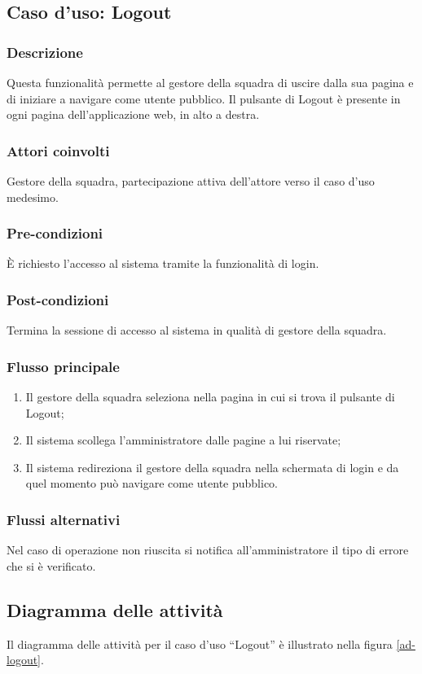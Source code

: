 %
%
\subsection{Caso d'uso: Logout}

\subsubsection*{Descrizione}
Questa funzionalità permette al gestore della squadra di uscire dalla sua pagina e di iniziare a navigare come utente pubblico.
Il pulsante di Logout è presente in ogni pagina dell'applicazione web, in alto a destra.

\subsubsection*{Attori coinvolti}
Gestore della squadra, partecipazione attiva dell'attore verso il caso d'uso medesimo.

\subsubsection*{Pre-condizioni}
È richiesto l'accesso al sistema tramite la funzionalità di login.

\subsubsection*{Post-condizioni}
Termina la sessione di accesso al sistema in qualità di gestore della squadra.

\subsubsection*{Flusso principale}

\begin{enumerate}
	
	\item
	Il gestore della squadra seleziona nella pagina in cui si trova il pulsante di Logout;
	
	\item
	Il sistema scollega l'amministratore dalle pagine a lui riservate;
	
	\item
	Il sistema redireziona il gestore della squadra nella schermata di login e da quel momento può navigare come utente pubblico.
	
\end{enumerate}

\subsubsection*{Flussi alternativi}
Nel caso di operazione non riuscita si notifica all'amministratore il tipo di errore che si è verificato.

\subsection*{Diagramma delle attività}
Il diagramma delle attività per il caso d'uso ``Logout'' è illustrato nella figura \vref{ad-logout}.